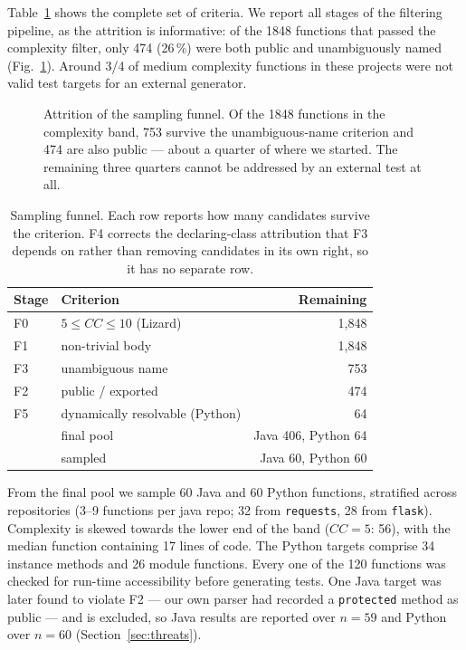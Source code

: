 Table~\ref{tab:funnel} shows the complete set of criteria. We report all stages of the
filtering pipeline, as the attrition is informative: of the 1848 functions that passed the
complexity filter, only 474 (26\,\%) were both public and unambiguously named
(Fig.~\ref{fig:funnel}). Around 3/4 of medium complexity functions in these projects were not
valid test targets for an external generator.

\begin{figure}[t]
\centering

\caption{Attrition of the sampling funnel. Of the 1848 functions in the complexity band, 753
survive the unambiguous-name criterion and 474 are also public --- about a quarter of where we
started. The remaining three quarters cannot be addressed by an external test at all.}
\label{fig:funnel}
\end{figure}

\begin{table}[t]
\centering
\caption{Sampling funnel. Each row reports how many candidates survive the criterion. F4
corrects the declaring-class attribution that F3 depends on rather than removing candidates in
its own right, so it has no separate row.}
\label{tab:funnel}
\begin{tabular}{llr}
\toprule
Stage & Criterion & Remaining \\
\midrule
F0 & $5 \le CC \le 10$ (Lizard)          & 1{,}848 \\
F1 & non-trivial body                    & 1{,}848 \\
F3 & unambiguous name                    & 753 \\
F2 & public / exported                   & 474 \\
F5 & dynamically resolvable (Python)     & 64 \\
\midrule
   & final pool                          & Java 406, Python 64 \\
   & sampled                             & Java 60, Python 60 \\
\bottomrule
\end{tabular}
\end{table}

From the final pool we sample 60 Java and 60 Python functions, stratified across repositories
(3--9 functions per java repo; 32 from \texttt{requests}, 28 from \texttt{flask}). Complexity
is skewed towards the lower end of the band ($CC{=}5$: 56), with the median function containing
17 lines of code. The Python targets comprise 34 instance methods and 26 module functions.
Every one of the 120 functions was checked for run-time accessibility before generating tests.
One Java target was later found to violate F2 --- our own parser had recorded a
\texttt{protected} method as public --- and is excluded, so Java results are reported over
$n = 59$ and Python over $n = 60$ (Section~\ref{sec:threats}).

